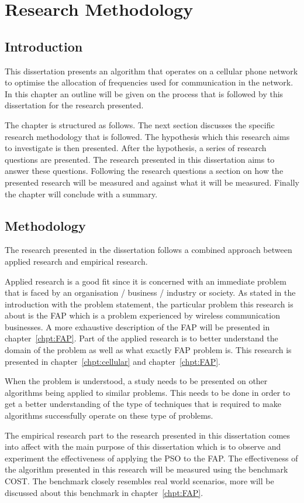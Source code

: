 \chapter{Research Methodology}
\section{Introduction}
This dissertation presents an algorithm that operates on a cellular phone network to optimise the allocation of frequencies used for communication in the network. In this chapter an outline will be given on the process that is followed by this dissertation for the research presented.

The chapter is structured as follows. The next section discusses the specific research methodology that is followed. The hypothesis which this research aims to investigate is then presented. After the hypothesis, a series of research questions are presented. The research presented in this dissertation aims to answer these questions.
Following the research questions a section on how the presented research will be measured and against what it will be measured. Finally the chapter will conclude with a summary.
\section{Methodology}
The research presented in the dissertation follows a combined approach between applied research and empirical research. 

Applied research is a good fit since it is concerned with an immediate problem that is faced by an organisation / business / industry or society. As stated in the introduction with the problem statement, the particular problem this research is about is the \gls{FAP} which is a problem experienced by wireless communication businesses. A more exhaustive description of the \gls{FAP} will be presented in chapter~\ref{chpt:FAP}.
Part of the applied research is to better understand the domain of the problem as well as what exactly \gls{FAP} problem is. This research is presented in chapter~\ref{chpt:cellular} and chapter~\ref{chpt:FAP}.

When the problem is understood, a study needs to be presented on other algorithms being applied to similar problems. This needs to be done in order to get a better understanding of the type of techniques that is required to make algorithms successfully operate on these type of problems.

The empirical research part to the research presented in this dissertation comes into affect with the main purpose of this dissertation which is to observe and experiment the effectiveness of applying the \gls{PSO} to the \gls{FAP}. The effectiveness of the algorithm presented in this research will be measured using the benchmark \gls{COST}. The benchmark closely resembles real world scenarios, more will be discussed about this benchmark in chapter~\ref{chpt:FAP}.

